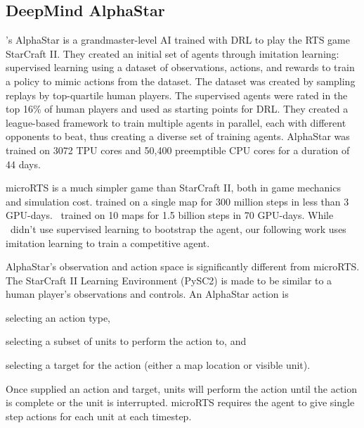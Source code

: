 \documentclass{article}
\begin{document}
\subsection{DeepMind AlphaStar}
\citet{Vinyals2019GrandmasterLI}'s AlphaStar is a grandmaster-level AI trained with DRL to play the RTS game
StarCraft II. They created an initial set of agents through imitation learning: supervised learning
using a dataset of observations, actions, and rewards to train a policy to mimic actions
from the dataset. The dataset was created by sampling replays by top-quartile human
players. The supervised agents were rated in the top 16\% of human players and used as
starting points for DRL. They created a league-based framework to train multiple agents
in parallel, each with different opponents to beat, thus creating a diverse set of
training agents. AlphaStar was trained on 3072 TPU cores and 50,400 preemptible CPU
cores for a duration of 44 days.

microRTS is a much simpler game than StarCraft II, both in game mechanics and simulation
cost. \citet{DBLP:journals/corr/abs-2105-13807} trained on a single map for 300 million
steps in less than 3 GPU-days. \agentName\ trained on 10 maps for 1.5 billion steps in
70 GPU-days. While \agentName\ didn't use supervised learning to bootstrap the agent,
our following work uses imitation learning to train a competitive agent.

AlphaStar's observation and action space is significantly different from microRTS. The
StarCraft II Learning Environment (PySC2) is made to be similar to a human player's
observations and controls. An AlphaStar action is 
\begin{inparaenum}[(1)]
    \item selecting an action type,
    \item selecting a subset of units to perform the action to, and
    \item selecting a target for the action (either a map location or visible unit).
\end{inparaenum}
Once supplied an action and target, units will perform the action until the action is complete or the unit is interrupted.
microRTS requires the agent to give single step actions for each unit at each timestep.
\end{document}
